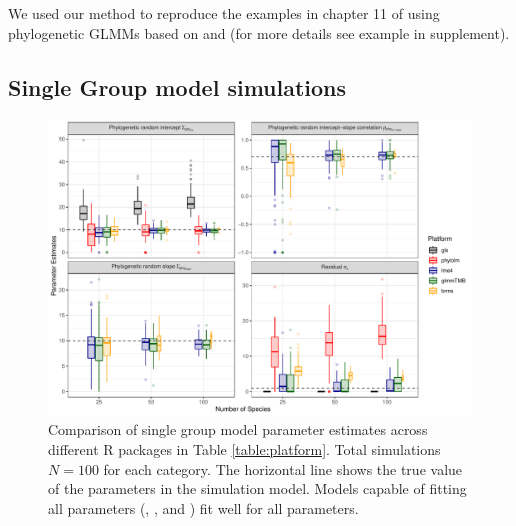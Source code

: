 \documentclass[12pt]{article}
\begin{document}
We used our method to reproduce the examples in chapter 11 of \cite{garamszegi2014modern} using phylogenetic GLMMs based on  and  (for more details see example in supplement).

\subsection*{Single Group model simulations}

\begin{center}
\begin{figure}[H]
  \includegraphics[scale=0.7]{./figure/ssplot.pdf}
  \caption{Comparison of single group model parameter estimates across different R packages in Table \ref{table:platform}. Total simulations $N=100$ for each category. The horizontal line shows the true value of the parameters in the simulation model. Models capable of fitting all parameters (,  , and ) fit well for all parameters.
}
\label{ssplot}
\end{figure}
\end{center}
\end{document}
